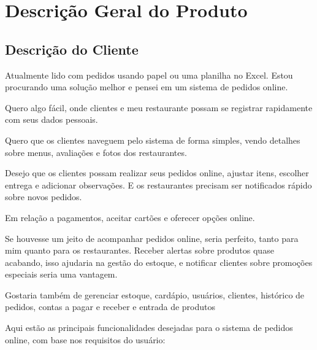 \chapter{Descrição Geral do Produto} \label{cap:descricaogeral}

\section{Descrição do Cliente}


Atualmente lido com pedidos usando papel ou uma planilha no Excel. Estou procurando uma solução melhor e pensei em um sistema de pedidos online.

Quero algo fácil, onde clientes e meu restaurante possam se registrar rapidamente com seus dados pessoais.

Quero que os clientes naveguem pelo sistema de forma simples, vendo detalhes sobre menus, avaliações e fotos dos restaurantes.

Desejo que os clientes possam realizar seus pedidos online, ajustar itens, escolher entrega e adicionar observações. E os restaurantes precisam ser notificados rápido sobre novos pedidos.

Em relação a pagamentos, aceitar cartões e oferecer opções online.

Se houvesse um jeito de acompanhar pedidos online, seria perfeito, tanto para mim quanto para os restaurantes. Receber alertas sobre produtos quase acabando, isso ajudaria na gestão do estoque, e notificar clientes sobre promoções especiais seria uma vantagem.

Gostaria também de gerenciar estoque, cardápio, usuários, clientes, histórico de pedidos, contas a pagar e receber e entrada de produtos

 Aqui estão as principais funcionalidades desejadas para o sistema de pedidos online, com base nos requisitos do usuário:

